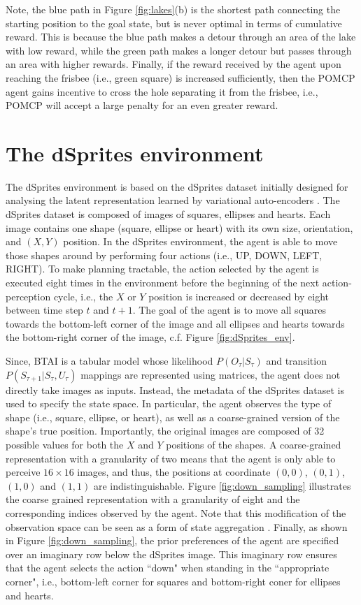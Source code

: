 \documentclass[twoside,11pt]{article}
\begin{document}
Note, the blue path in Figure \ref{fig:lakes}(b) is the shortest path connecting the starting position to the goal state, but is never optimal in terms of cumulative reward. This is because the blue path makes a detour through an area of the lake with low reward, while the green path makes a longer detour but passes through an area with higher rewards. Finally, if the reward received by the agent upon reaching the frisbee (i.e., green square) is increased sufficiently, then the POMCP agent gains incentive to cross the hole separating it from the frisbee, i.e., POMCP will accept a large penalty for an even greater reward.

\section{The dSprites environment}\label{sec:sprites_env}

The dSprites environment is based on the dSprites dataset \citep{dsprites17} initially designed for analysing the latent representation learned by variational auto-encoders \citep{VAE}. The dSprites dataset is composed of images of squares, ellipses and hearts. Each image contains one shape (square, ellipse or heart) with its own size, orientation, and $(X,Y)$ position. In the dSprites environment, the agent is able to move those shapes around by performing four actions (i.e., UP, DOWN, LEFT, RIGHT). To make planning tractable, the action selected by the agent is executed eight times in the environment before the beginning of the next action-perception cycle, i.e., the $X$ or $Y$ position is increased or decreased by eight between time step $t$ and $t+1$. The goal of the agent is to move all squares towards the bottom-left corner of the image and all ellipses and hearts towards the bottom-right corner of the image, c.f. Figure \ref{fig:dSprites_env}.

Since, BTAI is a tabular model whose likelihood $P(O_\tau|S_\tau)$ and transition $P(S_{\tau+1}|S_\tau,U_\tau)$ mappings are represented using matrices, the agent does not directly take images as inputs. Instead, the metadata of the dSprites dataset is used to specify the state space. In particular, the agent observes the type of shape (i.e., square, ellipse, or heart), as well as a coarse-grained version of the shape's true position. Importantly, the original images are composed of 32 possible values for both the $X$ and $Y$ positions of the shapes. A coarse-grained  representation with a granularity of two means that the agent is only able to perceive $16 \times 16$ images, and thus, the positions at coordinate $(0,0)$, $(0,1)$, $(1,0)$ and $(1,1)$ are indistinguishable. Figure \ref{fig:down_sampling} illustrates the coarse grained representation with a granularity of eight and the corresponding indices observed by the agent. Note that this modification of the observation space can be seen as a form of state aggregation \citep{STATES_AGGREG}. Finally, as shown in Figure \ref{fig:down_sampling}, the prior preferences of the agent are specified over an imaginary row below the dSprites image. This imaginary row ensures that the agent selects the action ``down" when standing in the ``appropriate corner", i.e., bottom-left corner for squares and bottom-right coner for ellipses and hearts.
\end{document}

